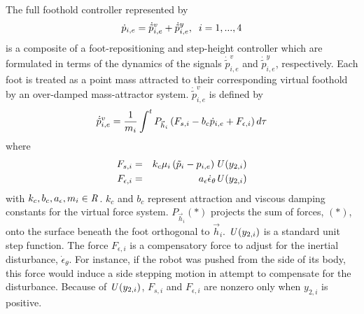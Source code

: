 %
		The full foothold controller represented by 
			\begin{equation}
				\dot{p}_{i,e} = \dot{\tilde{p}}_{i,e}^{v} + \dot{\tilde{p}}_{i,e}^{y}, \hspace{2mm} i = 1,...,4
			\end{equation} 
		is a composite of a foot-repositioning and step-height controller which are formulated in terms of the dynamics of the signals $\dot{\tilde{p}}_{i,e}^{v}$ and $\dot{\tilde{p}}_{i,e}^{y}$, respectively. Each foot is treated as a point mass attracted to their corresponding virtual foothold by an over-damped mass-attractor system. $\dot{\tilde{p}}_{i,e}^{v}$ is defined by
			\begin{equation}
				\label{eq::FootControl}
				\dot{\tilde{p}}_{i,e}^{v} 		= \frac{1}{m_{i}} \int^t{{P}_{\vec{h}_{i}} \left( F_{s,i}  -b_{c} \dot{p}_{i,e} + F_{\epsilon,i} \right) d\tau}
			\end{equation}
		where
			\begin{eqnarray*}
				F_{s,i} 			& = & k_{c}  \mu_{i} \left( \tilde{p}_{i} - {p}_{i,e} \right) \emph{U}\left(y_{2,i}\right)		\nonumber\\
				F_{\epsilon,i}		& = & a_{\epsilon}\dot{\epsilon}_{\theta} \emph{U}\left(y_{2,i}\right)						\nonumber
			\end{eqnarray*}
	 	with $k_{c},b_{c},a_{\epsilon},m_{i} \in\emph{R}^{}$.
		$k_{c}$ and $b_{c}$ represent  attraction and viscous damping constants for the virtual force system. ${P}_{\vec{h}_{i}}(*)$ projects the sum of  forces, $(*)$, onto the surface beneath the \Ith foot orthogonal to $\vec{h}_{i}$. $\emph{U}\left(y_{2,i}\right)$ is a standard unit step function. The force $F_{\epsilon,i}$ is a compensatory force to adjust for the inertial disturbance,  $\dot{\epsilon}_{\theta}$. For instance, if the robot was pushed from the side of its body, this force would induce a side stepping motion in attempt to compensate for the disturbance. Because of $\emph{U}\left(y_{2,i}\right)$, $F_{s,i}$ and $F_{\epsilon,i}$ are nonzero only when $y_{2,i}$ is positive.

